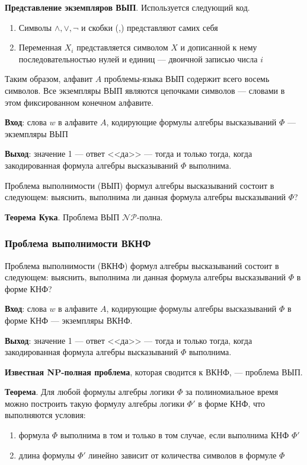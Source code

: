 \textbf{Представление экземпляров ВЫП}. Используется следующий код.
\begin{enumerate}
    \item Символы $\land, \lor, \lnot$ и скобки (,) представляют самих себя
    \item Переменная $X_i$ представляется символом $X$ и дописанной к нему последовательностью нулей и единиц --- двоичной записью числа $i$
\end{enumerate}

Таким образом, алфавит $A$ проблемы-языка ВЫП содержит всего восемь символов. Все экземпляры ВЫП являются цепочками символов --- словами в этом фиксированном конечном алфавите.

\textbf{Вход}: слова $w$ в алфавите $A$, кодирующие формулы алгебры высказываний $\Phi$ --- экземпляры ВЫП

\textbf{Выход}: значение 1 --- ответ <<да>>  --- тогда и только тогда, когда закодированная формула алгебры высказываний $\Phi$ выполнима.

Проблема выполнимости (ВЫП) формул алгебры высказываний состоит в следующем: выяснить, выполнима ли данная формула алгебры высказываний $\Phi$?


\textbf{Теорема Кука}. Проблема ВЫП $\mathscr{NP}$-полна.

\subsubsection{Проблема выполнимости ВКНФ}

Проблема выполнимости (ВКНФ) формул алгебры высказываний состоит в следующем: выяснить, выполнима ли данная формула алгебры высказываний $\Phi$ в форме КНФ?

\textbf{Вход}: слова $w$ в алфавите $A$, кодирующие формулы алгебры высказываний $\Phi$ в форме КНФ --- экземпляры ВКНФ.

\textbf{Выход}: значение 1 --- ответ <<да>>  --- тогда и только тогда, когда закодированная формула алгебры высказываний $\Phi$ выполнима.

\textbf{Известная NP-полная проблема}, которая сводится к ВКНФ, --- проблема ВЫП.

\textbf{Теорема}. Для любой формулы алгебры логики $\Phi$ за полиномиальное время можно построить такую формулу алгебры логики $\Phi'$ в форме КНФ, что выполняются условия:

\begin{enumerate}
    \item формула $\Phi$ выполнима в том и только в том случае, если выполнима КНФ $\Phi'$
    \item длина формулы $\Phi'$ линейно зависит от количества символов в формуле $\Phi$
\end{enumerate}

